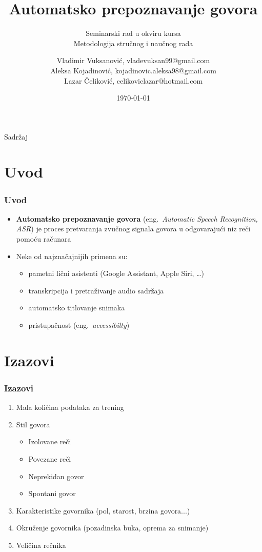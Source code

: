 \documentclass{beamer}
\title{Automatsko prepoznavanje govora}
\subtitle{Seminarski rad u okviru kursa\\Metodologija stručnog i naučnog rada}
\author[Vladimir Vuksanović, Aleksa Kojadinović, Lazar Čeliković]{
  \texorpdfstring{Vladimir Vuksanović, vladevuksan99@gmail.com\\Aleksa Kojadinović, kojadinovic.aleksa98@gmail.com\\Lazar Čeliković, celikoviclazar@hotmail.com}
  {Vladimir Vuksanović, Aleksa Kojadinović, Lazar Čeliković}
}
\institute{Matematički fakultet}
\date{\today}
\begin{document}
\frame{\titlepage}

\begin{frame}{Sadržaj}
  \tableofcontents[hideallsubsections]
\end{frame}

\section{Uvod}
\begin{frame}
  \frametitle{Uvod}

  \begin{itemize}
    \item \textbf{Automatsko prepoznavanje govora} (eng.~{\em Automatic Speech Recognition, ASR}) je proces pretvaranja zvučnog signala govora u odgovarajući niz reči pomoću računara
    \item Neke od najznačajnijih primena su:
    \begin{itemize}
      \item pametni lični asistenti (Google Assistant, Apple Siri, \dots)
      \item transkripcija i pretraživanje audio sadržaja
      \item automatsko titlovanje snimaka
      \item pristupačnost (eng.~{\em accessibilty})
    \end{itemize} 
  \end{itemize}
\end{frame}

\section{Izazovi}
\begin{frame}
  \frametitle{Izazovi}

  \begin{enumerate}
    \item Mala količina podataka za trening
    \item Stil govora
    \begin{itemize}
      \item Izolovane reči
      \item Povezane reči
      \item Neprekidan govor
      \item Spontani govor
    \end{itemize}
    \item Karakteristike govornika (pol, starost, brzina govora...)
    \item Okruženje govornika (pozadinska buka, oprema za snimanje)
    \item Veličina rečnika
  \end{enumerate}
\end{frame}
\end{document}
